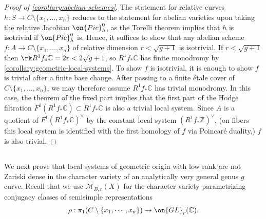 \subsection{}
\label{subsubsection:abelian-scheme-proof}
\begin{proof}[Proof of \autoref{corollary:abelian-schemes}]
	The statement for relative curves $h: S \to C \setminus \{x_1, \ldots, x_n\}$ reduces to the statement for abelian varieties
	upon taking the relative Jacobian $\on{Pic}^0_h$, as the Torelli theorem implies that
	$h$ is isotrivial if $\on{Pic}^0_h$ is.
	Hence, it suffices to show that any abelian scheme $f: A \to C \setminus\{x_1,
	\ldots, x_n\}$ of relative dimension $r < \sqrt{g+1}$ is isotrivial.
	If $r < \sqrt{g+1}$ then $\rk R^1 f_* \mathbb C = 2r < 2 \sqrt{g+1}$, so $R^1 f_* \mathbb C$ has
	finite monodromy by \autoref{corollary:geometric-local-systems}.
	To show $f$ is isotrivial, it is enough to show $f$ is trivial after a finite base change.
	After passing to a finite \'etale cover of
	$C \setminus\{x_1,\ldots, x_n\}$, we may therefore assume
	$R^1 f_* \mathbb C$ has trivial monodromy.
	In this case, the theorem of the fixed part
	\cite[Corollaire 4.1.2]{deligne:hodge-ii}
	implies that the first part of the Hodge filtration $F^1(R^1 f_* \mathbb
	C) \subset R^1 f_* \mathbb C$ is also a trivial local system.
	Since $A$ is a quotient of
	$F^1(R^1 f_* \mathbb C)^\vee$ by the constant local system
	$(R^1 f_* \mathbb Z)^\vee$,
	(on fibers this local system is identified with the first homology of $f$
	via Poincar\'e duality,)
	$f$ is also trivial.
\end{proof}


\subsection{}\label{subsubsection:non-density-proof}
We next prove that local systems of geometric origin with low rank are not
Zariski dense in the character variety of an analytically very general genus $g$
curve.
Recall that we use $\mathscr{M}_{B,r}(X)$ for the character variety
parametrizing conjugacy classes of semisimple representations $$\rho:
\pi_1(C\setminus\{x_1, \cdots, x_n\})\to \on{GL}_r(\mathbb{C}).$$

